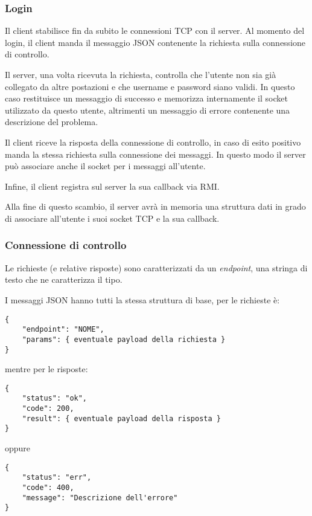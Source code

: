 \subsubsection{Login}
Il client stabilisce fin da subito le connessioni TCP con il server. Al momento del login, il client manda il messaggio JSON contenente la richiesta sulla connessione di controllo.

Il server, una volta ricevuta la richiesta, controlla che l'utente non sia già collegato da altre postazioni e che username e password siano validi. In questo caso restituisce un messaggio di successo e memorizza internamente il socket utilizzato da questo utente, altrimenti un messaggio di errore contenente una descrizione del problema.

Il client riceve la risposta della connessione di controllo, in caso di esito positivo manda la stessa richiesta sulla connessione dei messaggi. In questo modo il server può associare anche il socket per i messaggi all'utente.

Infine, il client registra sul server la sua callback via RMI.

Alla fine di questo scambio, il server avrà in memoria una struttura dati in grado di associare all'utente i suoi socket TCP e la sua callback.

\subsubsection{Connessione di controllo}
Le richieste (e relative risposte) sono caratterizzati da un \textit{endpoint}, una stringa di testo che ne caratterizza il tipo.

I messaggi JSON hanno tutti la stessa struttura di base, per le richieste è:
\begin{verbatim}
{
    "endpoint": "NOME",
    "params": { eventuale payload della richiesta }
}
\end{verbatim}

mentre per le risposte:
\begin{verbatim}
{
    "status": "ok",
    "code": 200,
    "result": { eventuale payload della risposta }
}
\end{verbatim}

oppure
\begin{verbatim}
{
    "status": "err",
    "code": 400,
    "message": "Descrizione dell'errore"
}
\end{verbatim}

